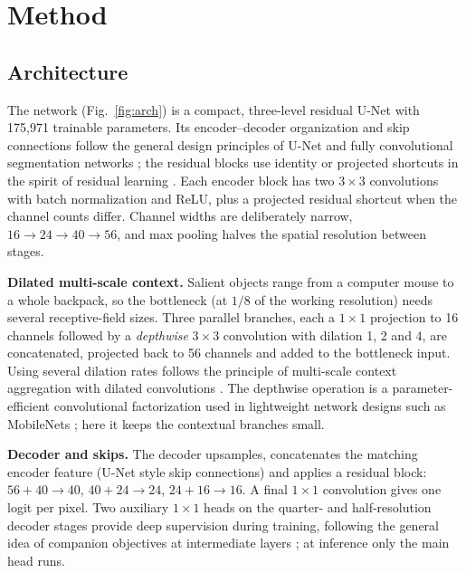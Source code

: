 \documentclass[10pt,a4paper,twocolumn]{article}
\begin{document}
\section{Method}
\subsection{Architecture}
The network (Fig.~\ref{fig:arch}) is a compact, three-level residual U-Net with 175{,}971 trainable parameters. Its encoder--decoder organization and skip connections follow the general design principles of U-Net and fully convolutional segmentation networks \cite{ronneberger2015unet,long2015fcn}; the residual blocks use identity or projected shortcuts in the spirit of residual learning \cite{he2016resnet}. Each encoder block has two $3{\times}3$ convolutions with batch normalization and ReLU, plus a projected residual shortcut when the channel counts differ. Channel widths are deliberately narrow, $16\!\to\!24\!\to\!40\!\to\!56$, and max pooling halves the spatial resolution between stages.

\textbf{Dilated multi-scale context.} Salient objects range from a computer mouse to a whole backpack, so the bottleneck (at $1/8$ of the working resolution) needs several receptive-field sizes. Three parallel branches, each a $1{\times}1$ projection to 16 channels followed by a \emph{depthwise} $3{\times}3$ convolution with dilation 1, 2 and 4, are concatenated, projected back to 56 channels and added to the bottleneck input. Using several dilation rates follows the principle of multi-scale context aggregation with dilated convolutions \cite{yu2016dilated}. The depthwise operation is a parameter-efficient convolutional factorization used in lightweight network designs such as MobileNets \cite{howard2017mobilenets}; here it keeps the contextual branches small.

\textbf{Decoder and skips.} The decoder upsamples, concatenates the matching encoder feature (U-Net style skip connections) and applies a residual block: $56{+}40\!\to\!40$, $40{+}24\!\to\!24$, $24{+}16\!\to\!16$. A final $1{\times}1$ convolution gives one logit per pixel. Two auxiliary $1{\times}1$ heads on the quarter- and half-resolution decoder stages provide deep supervision during training, following the general idea of companion objectives at intermediate layers \cite{lee2015dsn}; at inference only the main head runs.
\end{document}
